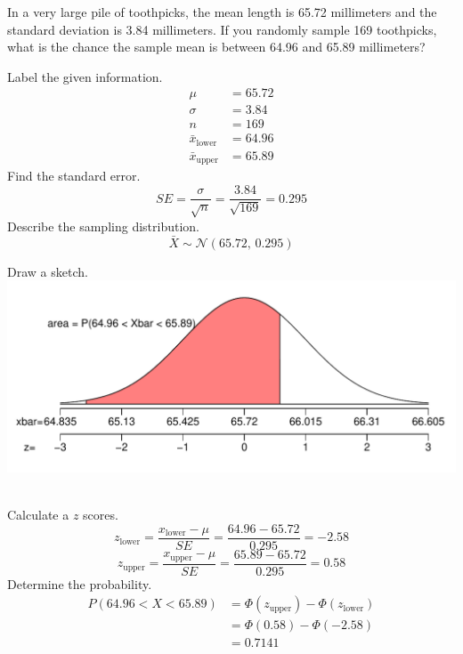 
\begin{question}
In a very large pile of toothpicks, the mean length is 65.72 millimeters
and the standard deviation is 3.84 millimeters. If you randomly sample
169 toothpicks, what is the chance the sample mean is between 64.96 and
65.89 millimeters?
\end{question}

\begin{solution}
Label the given information. \[ 
\begin{aligned}
\mu &= 65.72\\
\sigma &= 3.84\\
n &= 169\\
\bar{x}_\text{lower} &= 64.96 \\
\bar{x}_\text{upper} &= 65.89
\end{aligned}
\] Find the standard error.
\[SE = \frac{\sigma}{\sqrt{n}} = \frac{3.84}{\sqrt{169}} = 0.295 \]
Describe the sampling distribution.
\[\bar{X} \sim \mathcal{N}(65.72,\,0.295) \]

Draw a sketch.\\
\includegraphics{normal_sketch_sampling-1.pdf} ~

Calculate a \(z\) scores.
\[z_\text{lower} = \frac{x_\text{lower}-\mu}{SE} = \frac{64.96-65.72}{0.295} = -2.58 \]
\[z_\text{upper} = \frac{x_\text{upper}-\mu}{SE} = \frac{65.89-65.72}{0.295} = 0.58 \]
Determine the probability. \[
\begin{aligned}
P(64.96 < X < 65.89) &= \Phi(z_\text{upper}) - \Phi(z_\text{lower}) \\
&= \Phi(0.58) - \Phi(-2.58) \\
&= 0.7141 
\end{aligned}
\]
\end{solution}

